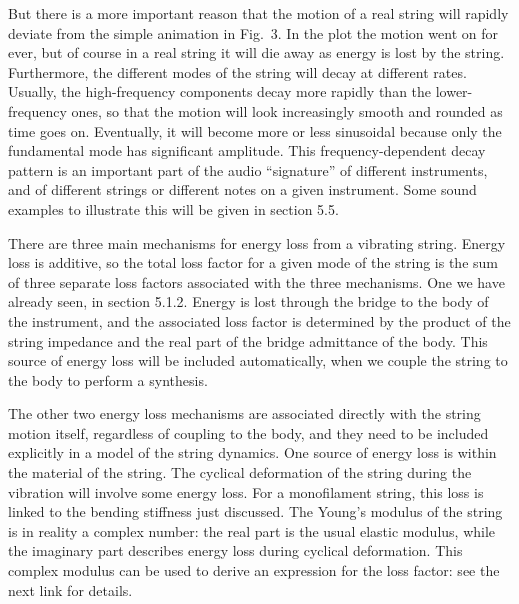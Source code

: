   But there is a more important reason that the motion of a real string will 
  rapidly deviate from the simple animation in Fig.\ 3. In the plot the motion 
  went on for ever, but of course in a real string it will die away as energy 
  is lost by the string. Furthermore, the different modes of the string will 
  decay at different rates. Usually, the high-frequency components decay more 
  rapidly than the lower-frequency ones, so that the motion will look 
  increasingly smooth and rounded as time goes on. Eventually, it will become 
  more or less sinusoidal because only the fundamental mode has significant 
  amplitude. This frequency-dependent decay pattern is an important part of the 
  audio ``signature'' of different instruments, and of different strings or 
  different notes on a given instrument. Some sound examples to illustrate this 
  will be given in section 5.5. 

  There are three main mechanisms for energy loss from a vibrating string. 
  Energy loss is additive, so the total loss factor for a given mode of the 
  string is the sum of three separate loss factors associated with the three 
  mechanisms. One we have already seen, in section 5.1.2. Energy is lost 
  through the bridge to the body of the instrument, and the associated loss 
  factor is determined by the product of the string impedance and the real part 
  of the bridge admittance of the body. This source of energy loss will be 
  included automatically, when we couple the string to the body to perform a 
  synthesis. 

  The other two energy loss mechanisms are associated directly with the string 
  motion itself, regardless of coupling to the body, and they need to be 
  included explicitly in a model of the string dynamics. One source of energy 
  loss is within the material of the string. The cyclical deformation of the 
  string during the vibration will involve some energy loss. For a monofilament 
  string, this loss is linked to the bending stiffness just discussed. The 
  Young's modulus of the string is in reality a complex number: the real part 
  is the usual elastic modulus, while the imaginary part describes energy loss 
  during cyclical deformation. This complex modulus can be used to derive an 
  expression for the loss factor: see the next link for details. 

